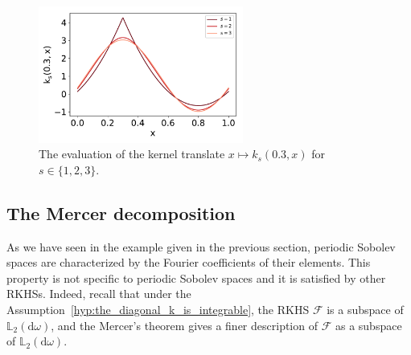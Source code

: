 \documentclass[twoside,11pt]{book}
\numberwithin{theorem}{chapter}
\numberwithin{definition}{chapter}
\numberwithin{proposition}{chapter}
\numberwithin{corollary}{chapter}
\numberwithin{example}{chapter}
\numberwithin{lemma}{chapter}
\numberwithin{assumption}{chapter}
\numberwithin{equation}{chapter}
\numberwithin{figure}{chapter}
\DeclareMathOperator{\Span}{\mathrm{Span}}
\begin{document}
\begin{figure}[]
    \centering
\includegraphics[width= 0.6\textwidth]{img/Sobolev/Bernoulli_kernels_same_node_s_1_3.pdf}
\caption{The evaluation of the kernel translate $x \mapsto k_{s}(0.3,x)$ for $s \in \{1,2,3\}$.
\label{fig:periodic_sobolev_kernel}}
\end{figure}




%
 


\subsection{The Mercer decomposition}
\label{subsec:mercer}
As we have seen in the example given in the previous section, periodic Sobolev spaces are characterized by the Fourier coefficients of their elements. This property is not specific to periodic Sobolev spaces and it is satisfied by other RKHSs. Indeed, recall that under the Assumption~\ref{hyp:the_diagonal_k_is_integrable}, the RKHS $\mathcal{F}$ is a subspace of $\mathbb{L}_{2}(\mathrm{d}\omega)$, and the Mercer's theorem gives a finer description of $\mathcal{F}$ as a subspace of $\mathbb{L}_{2}(\mathrm{d}\omega)$.
\end{document}
